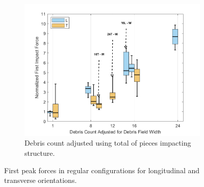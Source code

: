 \documentclass{article}
\begin{document}
{\begin{figure}[htbp]
\begin{subfigure}[t]{0.9\textwidth}
        \includegraphics[width=\textwidth]{FirstPeak_Regular_RemappedT.png}
        \caption{Debris count adjusted using total of pieces impacting structure.}
        \label{fig:firstpeak_regular_remap}
    \end{subfigure}
    \caption{First peak forces in regular configurations for longitudinal and transverse orientations.}
    \label{fig:firstpeak_regular_split}
\end{figure}

}
\end{document}
